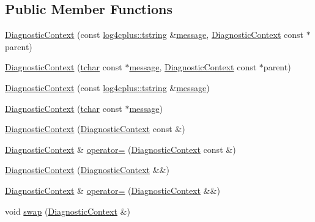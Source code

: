 \subsection*{Public Member Functions}
\begin{DoxyCompactItemize}
\item 
\hyperlink{structlog4cplus_1_1DiagnosticContext_a64cab7c4844adedb91296973522389d0}{Diagnostic\-Context} (const \hyperlink{namespacelog4cplus_a3c9287f6ebcddc50355e29d71152117b}{log4cplus\-::tstring} \&\hyperlink{structlog4cplus_1_1DiagnosticContext_a4f8953ae0220f13316a5905de32da0e3}{message}, \hyperlink{structlog4cplus_1_1DiagnosticContext}{Diagnostic\-Context} const $\ast$parent)
\item 
\hyperlink{structlog4cplus_1_1DiagnosticContext_a8aa3c292075e2bd9c8b316aa482e759d}{Diagnostic\-Context} (\hyperlink{namespacelog4cplus_a7b80b5711ae9e7a1ddd97dbaefbe3583}{tchar} const $\ast$\hyperlink{structlog4cplus_1_1DiagnosticContext_a4f8953ae0220f13316a5905de32da0e3}{message}, \hyperlink{structlog4cplus_1_1DiagnosticContext}{Diagnostic\-Context} const $\ast$parent)
\item 
\hyperlink{structlog4cplus_1_1DiagnosticContext_a9aea172325422f0a1bb9677754221332}{Diagnostic\-Context} (const \hyperlink{namespacelog4cplus_a3c9287f6ebcddc50355e29d71152117b}{log4cplus\-::tstring} \&\hyperlink{structlog4cplus_1_1DiagnosticContext_a4f8953ae0220f13316a5905de32da0e3}{message})
\item 
\hyperlink{structlog4cplus_1_1DiagnosticContext_a8060f3827b16568ff274a0cd31dd154e}{Diagnostic\-Context} (\hyperlink{namespacelog4cplus_a7b80b5711ae9e7a1ddd97dbaefbe3583}{tchar} const $\ast$\hyperlink{structlog4cplus_1_1DiagnosticContext_a4f8953ae0220f13316a5905de32da0e3}{message})
\item 
\hyperlink{structlog4cplus_1_1DiagnosticContext_aacd609143a5838f5a92a6de1960fcf66}{Diagnostic\-Context} (\hyperlink{structlog4cplus_1_1DiagnosticContext}{Diagnostic\-Context} const \&)
\item 
\hyperlink{structlog4cplus_1_1DiagnosticContext}{Diagnostic\-Context} \& \hyperlink{structlog4cplus_1_1DiagnosticContext_a9d47d4546c356516d684007f9a47bd25}{operator=} (\hyperlink{structlog4cplus_1_1DiagnosticContext}{Diagnostic\-Context} const \&)
\item 
\hyperlink{structlog4cplus_1_1DiagnosticContext_a2895e2122206a1ecf703fb62b2e982b8}{Diagnostic\-Context} (\hyperlink{structlog4cplus_1_1DiagnosticContext}{Diagnostic\-Context} \&\&)
\item 
\hyperlink{structlog4cplus_1_1DiagnosticContext}{Diagnostic\-Context} \& \hyperlink{structlog4cplus_1_1DiagnosticContext_a08ce4764cd0f11d2d909f3333511017e}{operator=} (\hyperlink{structlog4cplus_1_1DiagnosticContext}{Diagnostic\-Context} \&\&)
\item 
void \hyperlink{structlog4cplus_1_1DiagnosticContext_a8784195d3440ff3664369993ba8e627f}{swap} (\hyperlink{structlog4cplus_1_1DiagnosticContext}{Diagnostic\-Context} \&)
\end{DoxyCompactItemize}
